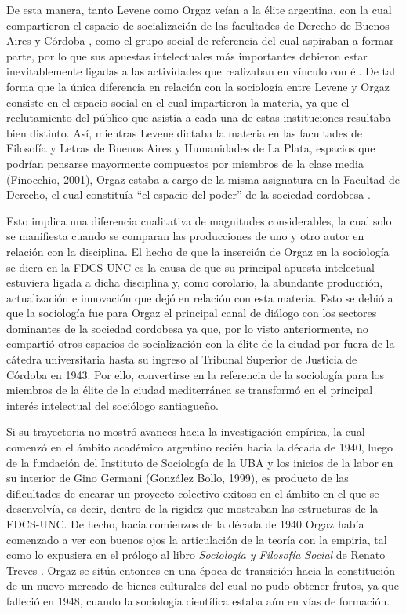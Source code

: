 De esta manera, tanto Levene como Orgaz veían a la élite argentina, con la cual compartieron el espacio de socialización de las facultades de Derecho de Buenos Aires y Córdoba \parencite{277-AGUERO2017,1542-ORTIZ2012}, como el grupo social de referencia del cual aspiraban a formar parte, por lo que sus apuestas intelectuales más importantes debieron estar inevitablemente ligadas a las actividades que realizaban en vínculo con él. De tal forma que la única diferencia en relación con la sociología entre Levene y Orgaz consiste en el espacio social en el cual impartieron la materia, ya que el reclutamiento del público que asistía a cada una de estas instituciones resultaba bien distinto. Así, mientras Levene dictaba la materia en las facultades de Filosofía y Letras de Buenos Aires y Humanidades de La Plata, espacios que podrían pensarse mayormente compuestos por miembros de la clase media \parencite{1537-BUCHBINDER1997}(Finocchio, 2001), Orgaz estaba a cargo de la misma asignatura en la Facultad de Derecho, el cual constituía \enquote{el espacio del poder} de la sociedad cordobesa \parencite[39]{1447-CARACCIOLO2010}.

Esto implica una diferencia cualitativa de magnitudes considerables, la cual solo se manifiesta cuando se comparan las producciones de uno y otro autor en relación con la disciplina. El hecho de que la inserción de Orgaz en la sociología se diera en la FDCS-UNC es la causa de que su principal apuesta intelectual estuviera ligada a dicha disciplina y, como corolario, la abundante producción, actualización e innovación que dejó en relación con esta materia. Esto se debió a que la sociología fue para Orgaz el principal canal de diálogo con los sectores dominantes de la sociedad cordobesa ya que, por lo visto anteriormente, no compartió otros espacios de socialización con la élite de la ciudad por fuera de la cátedra universitaria hasta su ingreso al Tribunal Superior de Justicia de Córdoba en 1943. Por ello, convertirse en la referencia de la sociología para los miembros de la élite de la ciudad mediterránea se transformó en el principal interés intelectual del sociólogo santiagueño.

Si su trayectoria no mostró avances hacia la investigación empírica, la cual comenzó en el ámbito académico argentino recién hacia la década de 1940, luego de la fundación del Instituto de Sociología de la UBA y los inicios de la labor en su interior de Gino Germani (González Bollo, 1999), es producto de las dificultades de encarar un proyecto colectivo exitoso en el ámbito en el que se desenvolvía, es decir, dentro de la rigidez que mostraban las estructuras de la FDCS-UNC. De hecho, hacia comienzos de la década de 1940 Orgaz había comenzado a ver con buenos ojos la articulación de la teoría con la empiria, tal como lo expusiera en el prólogo al libro \emph{Sociología y Filosofía Social} de Renato Treves \parencite{1546-ORGAZ1941}. Orgaz se sitúa entonces en una época de transición hacia la constitución de un nuevo mercado de bienes culturales del cual no pudo obtener frutos, ya que falleció en 1948, cuando la sociología científica estaba aún en vías de formación.

